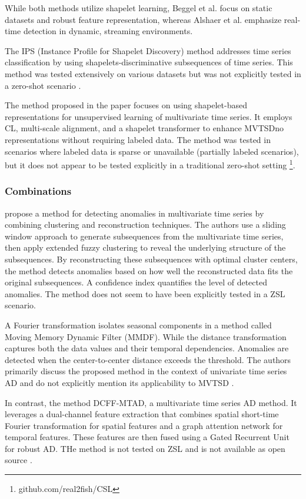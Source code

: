 While both methods utilize shapelet learning, Beggel et al. focus on static datasets and robust feature representation, whereas Alshaer et al. emphasize real-time detection in dynamic, streaming environments.

The IPS (Instance Profile for Shapelet Discovery) method addresses time series classification by using shapelets-discriminative subsequences of time series. This method was tested extensively on various datasets but was not explicitly tested in a zero-shot scenario \cite{li_ips_2022}.

The method proposed in the paper focuses on using shapelet-based representations for unsupervised learning of multivariate time series. It employs CL, multi-scale alignment, and a shapelet transformer to enhance MVTSDno representations without requiring labeled data. The method was tested in scenarios where labeled data is sparse or unavailable (partially labeled scenarios), but it does not appear to be tested explicitly in a traditional zero-shot setting
\cite{liang_shapelet-based_2024} \footnote{\fussy\tiny github.com/real2fish/CSL}.

\subsubsection{Combinations}
\cite{li_clustering-based_2021} propose a method for detecting anomalies in multivariate time series by combining clustering and reconstruction techniques. The authors use a sliding window approach to generate subsequences from the multivariate time series, then apply extended fuzzy clustering to reveal the underlying structure of the subsequences. By reconstructing these subsequences with optimal cluster centers, the method detects anomalies based on how well the reconstructed data fits the original subsequences. A confidence index quantifies the level of detected anomalies. The method does not seem to have been explicitly tested in a ZSL scenario.

A Fourier transformation isolates seasonal components in a method called Moving Memory Dynamic Filter (MMDF). While the distance transformation captures both the data values and their temporal dependencies. Anomalies are detected when the center-to-center distance exceeds the threshold. The authors primarily discuss the proposed method in the context of univariate time series AD and do not explicitly mention its applicability to MVTSD \cite{duan_unsupervised_2021}.

In contrast, the method DCFF-MTAD, a multivariate time series AD method. It leverages a dual-channel feature extraction that combines spatial short-time Fourier transformation for spatial features and a graph attention network for temporal features. These features are then fused using a Gated Recurrent Unit for robust AD. THe method is not tested on ZSL and is not available as open source \cite{xu_dcff-mtad_2023}.
